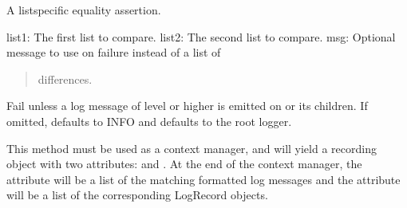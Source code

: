 \documentclass[letterpaper,10pt,english]{sphinxmanual}
\begin{document}
\begin{fulllineitems}
\begin{fulllineitems}
\end{fulllineitems}


\begin{fulllineitems}
\label{\detokenize{_autosummary/tests.test_unit.test_sqlite:tests.test_unit.test_sqlite.assertListEqual}}
\pysigstartsignatures
{}
\pysigstopsignatures
\sphinxAtStartPar
A list\sphinxhyphen{}specific equality assertion.
\begin{description}
\sphinxAtStartPar
list1: The first list to compare.
list2: The second list to compare.
msg: Optional message to use on failure instead of a list of
\begin{quote}

\sphinxAtStartPar
differences.
\end{quote}

\end{description}

\end{fulllineitems}


\begin{fulllineitems}
\label{\detokenize{_autosummary/tests.test_unit.test_sqlite:tests.test_unit.test_sqlite.assertLogs}}
\pysigstartsignatures
{}
\pysigstopsignatures
\sphinxAtStartPar
Fail unless a log message of level  or higher is emitted
on  or its children.  If omitted,  defaults to
INFO and  defaults to the root logger.

\sphinxAtStartPar
This method must be used as a context manager, and will yield
a recording object with two attributes:  and .
At the end of the context manager, the  attribute will
be a list of the matching formatted log messages and the
 attribute will be a list of the corresponding LogRecord
objects.


\end{fulllineitems}
\end{fulllineitems}
\end{document}
